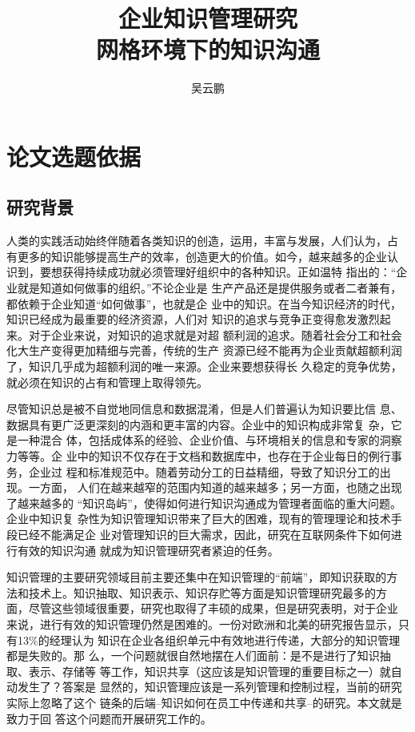 \documentclass[12pt,a4paper]{Ctexart}
\begin{document}
  \title{企业知识管理研究\\\large{ 网格环境下的知识沟通}}
  \author {吴云鹏}
   \maketitle
 \newpage
  \tableofcontents



\newpage
  \section{论文选题依据}

  \subsection{研究背景}
人类的实践活动始终伴随着各类知识的创造，运用，丰富与发展，人们认为，占
有更多的知识能够提高生产的效率，创造更大的价值。如今，越来越多的企业认
识到，要想获得持续成功就必须管理好组织中的各种知识。正如温特
\cite{Williamson1994}指出的：“企业就是知道如何做事的组织。”不论企业是
生产产品还是提供服务或者二者兼有，都依赖于企业知道“如何做事”，也就是企
业中的知识。在当今知识经济的时代，知识已经成为最重要的经济资源，人们对
知识的追求与竞争正变得愈发激烈起来。对于企业来说，对知识的追求就是对超
额利润的追求。随着社会分工和社会化大生产变得更加精细与完善，传统的生产
资源已经不能再为企业贡献超额利润了，知识几乎成为超额利润的唯一来源。企业来要想获得长
久稳定的竞争优势，就必须在知识的占有和管理上取得领先。

尽管知识总是被不自觉地同信息和数据混淆，但是人们普遍认为知识要比信
息、数据具有更广泛更深刻的内涵和更丰富的内容。企业中的知识构成非常复
杂，它是一种混合
体，包括成体系的经验、企业价值、与环境相关的信息和专家的洞察力等等。企
业中的知识不仅存在于文档和数据库中，也存在于企业每日的例行事务，企业过
程和标准规范中。随着劳动分工的日益精细，导致了知识分工的出现。一方面，
人们在越来越窄的范围内知道的越来越多；另一方面，也随之出现了越来越多的
“知识岛屿”，使得如何进行知识沟通成为管理者面临的重大问题。企业中知识复
杂性为知识管理知识带来了巨大的困难，现有的管理理论和技术手段已经不能满足企
业对管理知识的巨大需求，因此，研究在互联网条件下如何进行有效的知识沟通
就成为知识管理研究者紧迫的任务。

知识管理的主要研究领域目前主要还集中在知识管理的“前端”，即知识获取的方
法和技术上。知识抽取、知识表示、知识存贮等方面是知识管理研究最多的方
面，尽管这些领域很重要，研究也取得了丰硕的成果，但是研究表明，对于企业
来说，进行有效的知识管理仍然是困难的。一份对欧洲和北美的研究报告显示，只有13\%的经理认为
知识在企业各组织单元中有效地进行传递，大部分的知识管理都是失败的。那
么，一个问题就很自然地摆在人们面前：是不是进行了知识抽取、表示、存储等
等工作，知识共享（这应该是知识管理的重要目标之一）就自动发生了？答案是
显然的，知识管理应该是一系列管理和控制过程，当前的研究实际上忽略了这个
链条的后端--知识如何在员工中传递和共享--的研究。本文就是致力于回
答这个问题而开展研究工作的。
\end{document}
